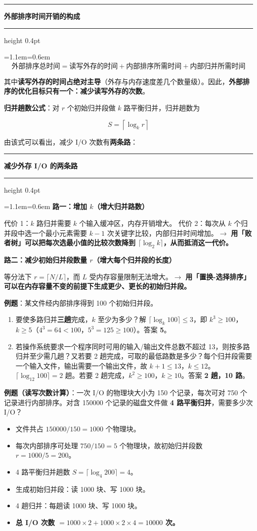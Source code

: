 \documentclass[11pt,openany,UTF8]{ctexbook}
\newcommand{\callouthead}[2]{%
  \par\addvspace{7pt}\noindent
  {\color{#1}\rule[-0.15em]{3pt}{1.05em}}\hspace{0.5em}%
  {\bfseries\color{#1}#2}\par\nobreak\vspace{-0.35em}%
  {\color{rulesep}\hrule height 0.4pt}\nobreak\vspace{0.45em}%
  \begingroup\small\setlength{\parindent}{0pt}%
  \leftskip=1.1em\rightskip=0.6em\noindent\ignorespaces}
\newcommand{\calloutend}{\par\endgroup\addvspace{7pt}}
\newenvironment{callkey}[1]{\callouthead{keybar}{#1}}{\calloutend}
\begin{document}
\begin{callkey}{外部排序时间开销的构成}
\[\text{外部排序总时间}=\text{读写外存的时间}+\text{内部排序所需时间}+\text{内部归并所需时间}\]

其中\textbf{读写外存的时间占绝对主导}（外存与内存速度差几个数量级）。因此，\textbf{外部排序的优化目标只有一个：减少读写外存的次数}。

\end{callkey}

\textbf{归并趟数公式}：对 $r$ 个初始归并段做 $k$ 路平衡归并，归并趟数为

\[S=\left\lceil\log_k r\right\rceil\]

由该式可以看出，减少 I/O 次数有\textbf{两条路}：

\begin{callkey}{减少外存 I/O 的两条路}
\textbf{路一：增加 $k$（增大归并路数）}

代价 1：$k$ 路归并需要 $k$ 个输入缓冲区，内存开销增大。 代价 2：每次从 $k$ 个归并段中选一个最小元素需要 $k-1$ 次关键字比较，内部归并时间增加。$\to$ \textbf{用「败者树」可以把每次选最小值的比较次数降到 $\lceil\log_2 k\rceil$，从而抵消这一代价。}

\textbf{路二：减少初始归并段数量 $r$（增大每个归并段的长度）}

等分法下 $r=\lceil N/L\rceil$，而 $L$ 受内存容量限制无法增大。$\to$ \textbf{用「置换-选择排序」可以在内存容量不变的前提下生成更少、更长的初始归并段。}

\end{callkey}

\textbf{例题}：某文件经内部排序得到 100 个初始归并段。

\begin{enumerate}
\item 要使多路归并\textbf{三趟}完成，$k$ 至少为多少？解 $\lceil\log_k 100\rceil\le 3$，即 $k^3\ge 100$，$k\ge 5$（$4^3=64<100$，$5^3=125\ge100$）。答案 \textbf{5}。
\item 若操作系统要求一个程序同时可用的输入/输出文件总数不超过 13，则按多路归并至少需几趟？又若要 2 趟完成，可取的最低路数是多少？每个归并段需要一个输入文件，输出需要一个输出文件，故 $k+1\le 13$，$k\le 12$。$\lceil\log_{12}100\rceil=2$ 趟。若要 2 趟完成，$k^2\ge 100$，$k\ge10$。答案 \textbf{2 趟，10 路}。
\end{enumerate}
\textbf{例题（读写次数计算）}：一次 I/O 的物理块大小为 150 个记录，每次可对 750 个记录进行内部排序。对含 150000 个记录的磁盘文件做 \textbf{4 路平衡归并}，需要多少次 I/O？

\begin{itemize}
\item 文件共占 $150000/150=1000$ 个物理块。
\item 每次内部排序可处理 $750/150=5$ 个物理块，故初始归并段数 $r=1000/5=200$。
\item 4 路平衡归并趟数 $S=\lceil\log_4 200\rceil=4$。
\item 生成初始归并段：读 1000 块、写 1000 块。
\item 4 趟归并：每趟读 1000 块、写 1000 块。
\item \textbf{总 I/O 次数 $=1000\times2+1000\times2\times4=10000$ 次。}
\end{itemize}
\end{document}
